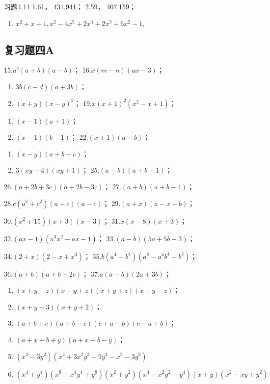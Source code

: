 习题4.11 1.61， 431.941； 2.59， 407.159；

\begin{enumerate}[start=3]
\item
  \(x^{2} + x + 1, x^{2} - 4x^{5} + 2x^{4} + 2x^{3} + 6x^{2} - 1,\)
\end{enumerate}

\subsection{复习题四A}

15.\(a^2 (a + b)(a - b)\)； 16.\(x(m - n)(ax - 3)\)；
\begin{enumerate}[start=17]
\item
  \(3b(c - d)(a + 3b)\)；
\item
  \((x + y)(x - y)^2\)； 19.\(x(x + 1)^2 (x^2 - x + 1)\)；
\end{enumerate}
\begin{enumerate}[start=20]
\item
  \((x - 1)(a + 1)\)；
\item
  \((x - 1)(b - 1)\)； 22.\((x + 1)(a - b)\)；
\end{enumerate}
\begin{enumerate}[start=23]
\item
  \((x - y)(a + b - c)\)；
\item
  \(3(xy-4)(xy+1)\)； 25.\((a-b)(a+b-1)\)；
\end{enumerate}

26.\((a + 2b + 3c)(a + 2b - 3c)\)； 27.\((a + b)(a + b - 4)\)；

28.\(c(a^{2} + c^{2})(a + c)(a - c)\)； 29.\((a + x)(a - x - b)\)；

30.\((x^{2} + 15)(x + 3)(x - 3)\)； 31.\(x(x - 8)(x + 3)\)；

32.\((ax - 1)(a^3 x^2 - ax - 1)\)； 33.\((a - b)(5a + 5b - 3)\)；

34.\((2 + x)(2 - x + x^3)\)； 35.\(b(a^4 + b^4)(a^8 - a^4b^4 + b^3)\)；

36.\((a + b)(a + b + 2c)\)； 37.\(a(a - b)(2a + 3b)\)；

\begin{enumerate}[start=38]
\item
  \((x + y - z)(x - y + z)(x + y + z)(x - y - z)\)；
\item
  \((x + y - 3)(x + y + 2)\)；
\item
  \((a + b + c)(a + b - c)(c + a - b)(c - a + b)\)；
\item
  \((a + x + b + y)(a + x - b - y)\)；
\item
  \((x^{2} - 3y^{2})(x^{4} + 3x^{2}y^{2} + 9y^{4} - x^{2} - 3y^{2})\)
\item
  \((x^{4} + y^{4})(x^{8} - x^{4}y^{4} + y^{8})(x^{2} + y^{2})(x^{4} - x^{2}y^{2} + y^{4})(x + y)(x^{2} - xy + y^{2})\)
\end{enumerate}

